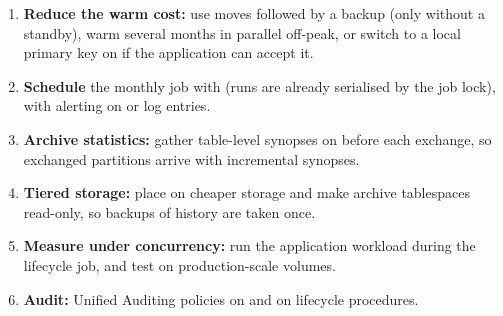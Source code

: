 \begin{enumerate}
  \item \textbf{Reduce the warm cost:} use  moves followed by a backup (only
        without a standby), warm several months in parallel off-peak, or switch to a local
        primary key on  if the application can accept it.
  \item \textbf{Schedule} the monthly job with  (runs are already
        serialised by the job lock), with alerting on  or  log entries.
  \item \textbf{Archive statistics:} gather table-level synopses on 
        before each exchange, so exchanged partitions arrive with incremental synopses.
  \item \textbf{Tiered storage:} place  on cheaper storage and make archive
        tablespaces read-only, so backups of history are taken once.
  \item \textbf{Measure under concurrency:} run the application workload during the lifecycle
        job, and test on production-scale volumes.
  \item \textbf{Audit:} Unified Auditing policies on  and on lifecycle
        procedures.
\end{enumerate}
